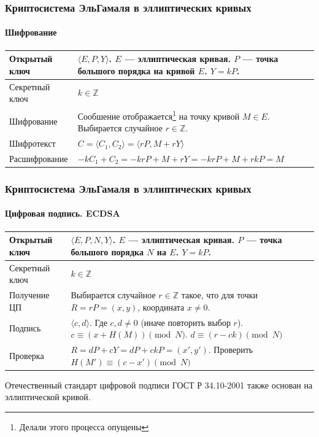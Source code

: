 \begin{frame}
    \frametitle{Криптосистема ЭльГамаля в эллиптических кривых}
    \framesubtitle{Шифрование}

    \begin{table}[ht]
        \centering
        \begin{tabular}[c]{p{}|p{}}
            \hline\hline
            Открытый ключ & $\langle E,P,Y\rangle$. $E$ --- эллиптическая кривая. $P$ --- точка большого порядка на кривой $E$. $Y=kP$. \\ \hline
            Секретный ключ & $k\in\mathbb{Z}$\\ \hline
            Шифрование & Сообшение отображается\footnote{Делали этого процесса опущены} на точку кривой $M\in E$. Выбирается случайное $r\in\mathbb{Z}$.\\ 
            Шифротекст & $C=\langle C_1,C_2\rangle=\langle rP,M+rY\rangle$\\
            Расшифрование & $-kC_1+C_2=-krP+M+rY=-krP+M+rkP=M$\\
            \hline\hline
        \end{tabular}
    \end{table}
\end{frame}


\begin{frame}
    \frametitle{Криптосистема ЭльГамаля в эллиптических кривых}
    \framesubtitle{Цифровая подпись. ECDSA}

    \begin{table}[ht]
        \centering
        \begin{tabular}[c]{p{}|p{}}
            \hline\hline
            Открытый ключ   & $\langle E,P,N,Y\rangle$. $E$ --- эллиптическая кривая. 
                              $P$ --- точка большого порядка $N$ на $E$. 
                              $Y=kP$. \\ \hline
            Секретный ключ  & $k\in\mathbb{Z}$\\ \hline
            Получение ЦП    & Выбирается случайное $r\in\mathbb{Z}$ такое, 
                              что для точки $R=rP=(x,y)$, координата $x\neq 0$. \\ 
            Подпись         & $\langle c,d\rangle$. Где $c,d\neq 0$ 
                              (иначе повторить выбор $r$). $c\equiv(x+H(M))\pmod{N}$. 
                              $d\equiv(r-ck)\pmod{N}$\\
            Проверка        & $R=dP+cY=dP+ckP=(x',y')$. Проверить $H(M')\equiv(c-x') \pmod{N}$\\
            \hline\hline
        \end{tabular}
    \end{table}
    Отечественный стандарт цифровой подписи ГОСТ Р 34.10-2001 также основан на эллиптической кривой.
\end{frame}


